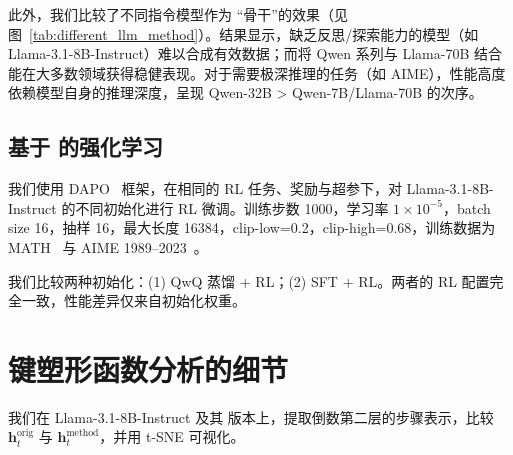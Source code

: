 \begin{table}[t]
\centering
{}
\caption{三种初始化方式在 RL 微调后的表现对比。}
\label{tab:rl_results}
\end{table}

此外，我们比较了不同指令模型作为 \method“骨干”的效果（见图~\ref{tab:different_llm_method}）。结果显示，缺乏反思/探索能力的模型（如 Llama-3.1-8B-Instruct）难以合成有效数据；而将 Qwen 系列与 Llama-70B 结合能在大多数领域获得稳健表现。对于需要极深推理的任务（如 AIME），性能高度依赖模型自身的推理深度，呈现 Qwen-32B > Qwen-7B/Llama-70B 的次序。

\subsection{基于 \method 的强化学习}
我们使用 DAPO~\citep{yu2025dapo} 框架，在相同的 RL 任务、奖励与超参下，对 Llama-3.1-8B-Instruct 的不同初始化进行 RL 微调。训练步数 1000，学习率 $1\times10^{-5}$，batch size 16，抽样 16，最大长度 16384，clip-low=0.2，clip-high=0.68，训练数据为 MATH~\citep{hendrycks2021measuring} 与 AIME 1989--2023~\citep{aime_1983_2024}。

我们比较两种初始化：(1) QwQ 蒸馏 + RL；(2) \method SFT + RL。两者的 RL 配置完全一致，性能差异仅来自初始化权重。


\section{键塑形函数分析的细节}
\label{app:bond_shaping_setting}
我们在 Llama-3.1-8B-Instruct 及其 \method 版本上，提取倒数第二层的步骤表示，比较 $\mathbf{h}^{\text{orig}}_t$ 与 $\mathbf{h}^{\text{method}}_t$，并用 t-SNE 可视化。

